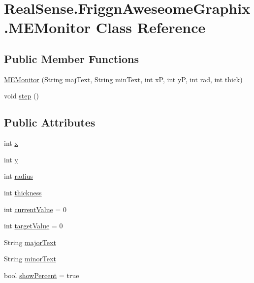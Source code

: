 \hypertarget{class_real_sense_1_1_friggn_aweseome_graphix_1_1_m_e_monitor}{}\section{Real\+Sense.\+Friggn\+Aweseome\+Graphix.\+M\+E\+Monitor Class Reference}
\label{class_real_sense_1_1_friggn_aweseome_graphix_1_1_m_e_monitor}
\subsection*{Public Member Functions}
\begin{DoxyCompactItemize}
\item 
\hyperlink{class_real_sense_1_1_friggn_aweseome_graphix_1_1_m_e_monitor_a8df7ffb411949e73cc37344326d325a3}{M\+E\+Monitor} (String maj\+Text, String min\+Text, int xP, int yP, int rad, int thick)
\item 
void \hyperlink{class_real_sense_1_1_friggn_aweseome_graphix_1_1_m_e_monitor_a59efc180805be50c7ed2a7b37e0aa0ef}{step} ()
\end{DoxyCompactItemize}
\subsection*{Public Attributes}
\begin{DoxyCompactItemize}
\item 
int \hyperlink{class_real_sense_1_1_friggn_aweseome_graphix_1_1_m_e_monitor_aae94a9af9eba40d10677cffeee537737}{x}
\item 
int \hyperlink{class_real_sense_1_1_friggn_aweseome_graphix_1_1_m_e_monitor_a05c8b06b952fbdfff729f92498996212}{y}
\item 
int \hyperlink{class_real_sense_1_1_friggn_aweseome_graphix_1_1_m_e_monitor_aac6a6a6847e001a75e2b2316386ee864}{radius}
\item 
int \hyperlink{class_real_sense_1_1_friggn_aweseome_graphix_1_1_m_e_monitor_abb4069ab5c96cb77807c8ec988073bb0}{thickness}
\item 
int \hyperlink{class_real_sense_1_1_friggn_aweseome_graphix_1_1_m_e_monitor_adc8792c41789b6f038d7dc5d5c6e7496}{current\+Value} = 0
\item 
int \hyperlink{class_real_sense_1_1_friggn_aweseome_graphix_1_1_m_e_monitor_aa73071b1e565f6765783baf18ce5b2c7}{target\+Value} = 0
\item 
String \hyperlink{class_real_sense_1_1_friggn_aweseome_graphix_1_1_m_e_monitor_a4cdd7aad6b3e84b9429518891618b195}{major\+Text}
\item 
String \hyperlink{class_real_sense_1_1_friggn_aweseome_graphix_1_1_m_e_monitor_a6bbf9a1ee06067597b933da3e34e3ee5}{minor\+Text}
\item 
bool \hyperlink{class_real_sense_1_1_friggn_aweseome_graphix_1_1_m_e_monitor_a4a07682a2e90f7433ae6fdb9df8f9b97}{show\+Percent} = true
\end{DoxyCompactItemize}


